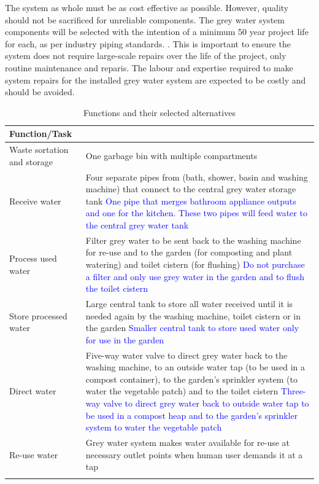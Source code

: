\documentclass[a4paper,11pt,fleqn]{report}
\begin{document}
{The system as whole must be as cost effective as possible. However, quality should not be sacrificed for unreliable components. The grey water system components will be selected with the intention of a minimum 50 year project life for each, as per industry piping standards. \citep{Fischer2012}. This is important to ensure the system does not require large-scale repairs over the life of the project, only routine maintenance and reparis. The labour and expertise required to make system repairs for the installed grey water system are expected to be costly and should be avoided.
%
\begin{table}[h!]
\caption {Functions and their selected alternatives} \label{tb: chosen_Alts} 
\begin{center}
\begin{tabular}{p{3.5cm}|p{9cm}}\toprule
	{\textbf{Function/Task}} & {\textbf{Selected Alternative}\\ \midrule
    Waste sortation and storage & One garbage bin with multiple compartments \\
     \hline
     Receive water & Four separate pipes from (bath, shower, basin and washing machine) that connect to the central grey water storage tank \textcolor{blue}{One pipe that merges bathroom appliance outputs and one for the kitchen. These two pipes will feed water to the central grey water tank}\\
    \hline
    Process used water & Filter grey water to be sent back to the washing machine for re-use and to the garden (for composting and plant watering) and toilet cistern (for flushing) \textcolor{blue}{Do not purchase a filter and only use grey water in the garden and to flush the toilet cistern}\\
    \hline
    Store processed water & Large central tank to store all water received until it is needed again by the washing machine, toilet cistern or in the garden \textcolor{blue}{Smaller central tank to store used water only for use in the garden}\\
    \hline
    Direct water & Five-way water valve to direct grey water back to the washing machine, to an outside water tap (to be used in a compost container), to the garden's sprinkler system (to water the vegetable patch) and to the toilet cistern \textcolor{blue}{Three-way valve to direct grey water back to outside water tap to be used in a compost heap and to the garden's sprinkler system to water the vegetable patch}\\
    \hline
    Re-use water & Grey water system makes water available for re-use at necessary outlet points when human user demands it at a tap\\
}
\end{tabular}
\end{center}
\end{table}}
\end{document}
